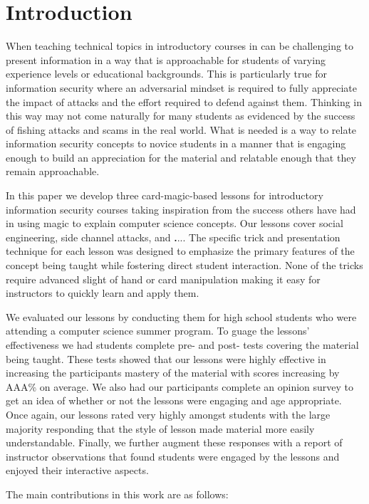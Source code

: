 \section{Introduction}
\label{SEC:introduction}

When teaching technical topics
in introductory courses
in can be challenging
to present information
in a way that is approachable
for students of varying
experience levels
or educational backgrounds.
This is particularly true
for information security
where an adversarial mindset
is required
to fully appreciate the impact of attacks and the effort required to
defend against them.
Thinking in this way
may not come naturally
for many students
as evidenced
by the success of fishing attacks
and scams in the real world.
What is needed
is a way
to relate information security concepts
to novice students
in a manner
that is engaging enough
to build an appreciation for the material
and relatable enough that they remain approachable.

In this paper
we develop three card-magic-based lessons
for introductory information security courses
taking inspiration
from the success others have had
in using magic
to explain computer science concepts.
Our lessons cover social engineering,
side channel attacks,
and {\textbf ...}.
The specific trick and presentation technique
for each lesson was designed to emphasize the primary
features of the concept being taught
while fostering direct student interaction.
None of the tricks require advanced slight of hand
or card manipulation making
it easy for instructors to quickly learn and apply them.


We evaluated our lessons by conducting them for high school students
who were attending a computer science summer program.  To guage the lessons'
effectiveness we had students complete pre- and post- tests covering the
material being taught.  These tests showed that our lessons were highly
effective in increasing the participants mastery of the material with scores
increasing by AAA\% on average.
We also had our participants complete an opinion survey to get an idea of
whether or not the lessons were engaging and age appropriate.  Once again, our
lessons rated very highly amongst students with the large majority responding
that the style of lesson made material more easily understandable.  Finally, we
further augment these responses with a report of instructor observations that
found students were engaged by the lessons and enjoyed their interactive
aspects.


The main contributions in this work are as follows:

